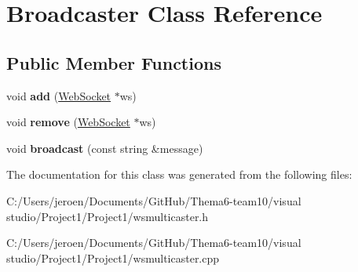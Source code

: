 \hypertarget{class_broadcaster}{}\section{Broadcaster Class Reference}
\label{class_broadcaster}
\subsection*{Public Member Functions}
\begin{DoxyCompactItemize}
\item 
void {\bfseries add} (\hyperlink{class_web_socket}{Web\+Socket} $\ast$ws)\hypertarget{class_broadcaster_a6e9d33aac7636a560f570acbd601e287}{}\label{class_broadcaster_a6e9d33aac7636a560f570acbd601e287}

\item 
void {\bfseries remove} (\hyperlink{class_web_socket}{Web\+Socket} $\ast$ws)\hypertarget{class_broadcaster_a68bbd90d33cd600e6b205f3df4e23d2b}{}\label{class_broadcaster_a68bbd90d33cd600e6b205f3df4e23d2b}

\item 
void {\bfseries broadcast} (const string \&message)\hypertarget{class_broadcaster_ac3ad5dc407bcf13111f9b95099cff823}{}\label{class_broadcaster_ac3ad5dc407bcf13111f9b95099cff823}

\end{DoxyCompactItemize}


The documentation for this class was generated from the following files\+:\begin{DoxyCompactItemize}
\item 
C\+:/\+Users/jeroen/\+Documents/\+Git\+Hub/\+Thema6-\/team10/visual studio/\+Project1/\+Project1/wsmulticaster.\+h\item 
C\+:/\+Users/jeroen/\+Documents/\+Git\+Hub/\+Thema6-\/team10/visual studio/\+Project1/\+Project1/wsmulticaster.\+cpp\end{DoxyCompactItemize}
